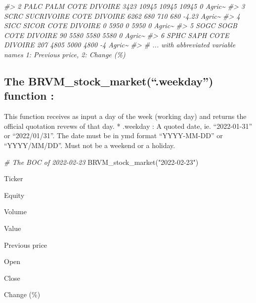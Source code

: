 \documentclass[
]{article}
\newenvironment{Shaded}{\begin{snugshade}}{\end{snugshade}}
\newcommand{\CommentTok}[1]{\textcolor[rgb]{0.56,0.35,0.01}{\textit{#1}}}
\newcommand{\FunctionTok}[1]{\textcolor[rgb]{0.00,0.00,0.00}{#1}}
\newcommand{\NormalTok}[1]{#1}
\newcommand{\StringTok}[1]{\textcolor[rgb]{0.31,0.60,0.02}{#1}}
\begin{document}
\begin{Shaded}
\begin{Highlighting}[]
\CommentTok{\#\textgreater{} 2 PALC   PALM COTE D\textquotesingle{}IVOIRE         3423        10945 10945 10945    0    Agric\textasciitilde{}}
\CommentTok{\#\textgreater{} 3 SCRC   SUCRIVOIRE COTE D\textquotesingle{}IVOIRE   6262          680   710   680   {-}4.23 Agric\textasciitilde{}}
\CommentTok{\#\textgreater{} 4 SICC   SICOR COTE D\textquotesingle{}IVOIRE           0         5950     0  5950    0    Agric\textasciitilde{}}
\CommentTok{\#\textgreater{} 5 SOGC   SOGB COTE D\textquotesingle{}IVOIRE           90         5580  5580  5580    0    Agric\textasciitilde{}}
\CommentTok{\#\textgreater{} 6 SPHC   SAPH COTE D\textquotesingle{}IVOIRE          207         4805  5000  4800   {-}4    Agric\textasciitilde{}}
\CommentTok{\#\textgreater{} \# ... with abbreviated variable names 1: \textasciigrave{}Previous price\textasciigrave{}, 2: \textasciigrave{}Change (\%)\textasciigrave{}}
\end{Highlighting}
\end{Shaded}

\hypertarget{the-brvm_stock_market.weekday-function}{%
\subsection{\texorpdfstring{The
\textbf{BRVM\_stock\_market(``.weekday'')} function
:}{The BRVM\_stock\_market(``.weekday'') function :}}\label{the-brvm_stock_market.weekday-function}}

This function receives as input a day of the week (working day) and
returns the official quotation revews of that day. * .weekday : A quoted
date, ie. ``2022-01-31'' or ``2022/01/31''. The date must be in ymd
format ``YYYY-MM-DD'' or ``YYYY/MM/DD''. Must not be a weekend or a
holiday.

\begin{Shaded}
\begin{Highlighting}[]
\CommentTok{\# The BOC of 2022{-}02{-}23}
\FunctionTok{BRVM\_stock\_market}\NormalTok{(}\StringTok{"2022{-}02{-}23"}\NormalTok{)}
\end{Highlighting}
\end{Shaded}

Ticker

Equity

Volume

Value

Previous price

Open

Close

Change (\%)
\end{document}
